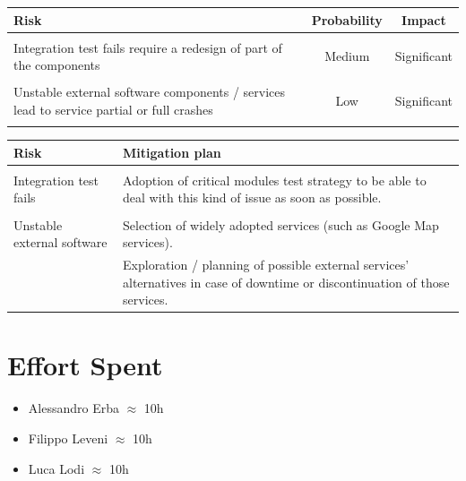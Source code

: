 \documentclass[english]{article}
\begin{document}
	\begin{table}[H]
		\centering
		\begin{tabular}{ p{7cm} c c }
		\textbf{Risk} & \textbf{Probability} & \textbf{Impact} \\ \hline \\
		Integration test fails require a redesign of part of the components & Medium & Significant \\  \\
		Unstable external software components / services lead to service partial or full crashes & Low & Significant \\ \\
				\end{tabular}
	\end{table}
	
	\begin{table}[H]
		\centering
		\begin{tabular}{ p{5cm} p{6cm} }
		\textbf{Risk} & \textbf{Mitigation plan} \\ \hline \\
		 Integration test fails  &  Adoption of critical modules test strategy to be able to deal with this kind of issue as soon as possible. \\  \\
		Unstable external software  & Selection of widely adopted services (such as Google Map services). \\
		& Exploration / planning of possible external services' alternatives in case of downtime or discontinuation of those services. \\
		\end{tabular}
	\end{table}
	
	
	


\section{Effort Spent}

\begin{itemize}
		\item Alessandro Erba $\approx$ 10h
		\item Filippo Leveni 	$\approx$ 10h
		\item Luca Lodi $\approx$ 10h
	\end{itemize}
\end{document}
